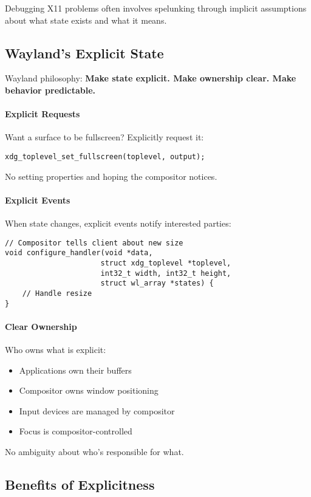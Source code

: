 Debugging X11 problems often involves spelunking through implicit assumptions about what state exists and what it means.

\subsection{Wayland's Explicit State}

Wayland philosophy: \textbf{Make state explicit. Make ownership clear. Make behavior predictable.}

\paragraph{Explicit Requests}
Want a surface to be fullscreen? Explicitly request it:
\begin{lstlisting}[style=cstyle]
xdg_toplevel_set_fullscreen(toplevel, output);
\end{lstlisting}

No setting properties and hoping the compositor notices.

\paragraph{Explicit Events}
When state changes, explicit events notify interested parties:
\begin{lstlisting}[style=cstyle]
// Compositor tells client about new size
void configure_handler(void *data,
                      struct xdg_toplevel *toplevel,
                      int32_t width, int32_t height,
                      struct wl_array *states) {
    // Handle resize
}
\end{lstlisting}

\paragraph{Clear Ownership}
Who owns what is explicit:
\begin{itemize}
    \item Applications own their buffers
    \item Compositor owns window positioning
    \item Input devices are managed by compositor
    \item Focus is compositor-controlled
\end{itemize}

No ambiguity about who's responsible for what.

\subsection{Benefits of Explicitness}

